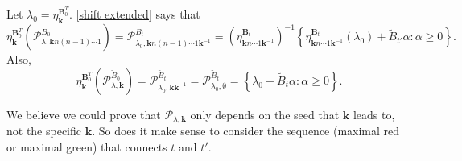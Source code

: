 \documentclass{amsart}
\theoremstyle{definition}
\theoremstyle{remark}
\numberwithin{equation}{section}
\newcommand{\set}[1]{{\left\lbrace #1 \right\rbrace}}
\newcommand{\GG}{{\mathbf G}}
\newcommand{\0}{{\mathbf{0}}}
\newcommand{\kk}{\mathbf{k}}
\newcommand{\tB}{{\tilde{B}}}
\newcommand{\BB}{\mathbf{B}}
\renewcommand{\P}{\mathcal{P}}
\begin{document}


Let $\lambda_0=\eta_\kk^{\BB_0^T}$.
\cref{shift extended} says that  
\[\eta_\kk^{\BB_0^T}(\P_{\lambda,\kk n(n-1)\cdots1}^{\tB_0})=\P_{\lambda_0,\kk n(n-1)\cdots1\kk^{-1}}^{\tB_t}=\left(\eta^{\BB_t}_{\kk n\cdots1\kk^{-1}}\right)^{-1}\set{\eta^{\BB_t}_{\kk n\cdots1\kk^{-1}}(\lambda_0)+\tB_{t'}\alpha:\alpha\ge0}.\]
Also, 
\[\eta_\kk^{\BB_0^T}(\P_{\lambda,\kk}^{\tB_0})=\P_{\lambda_0,\kk\kk^{-1}}^{\tB_t}=\P_{\lambda_0,\emptyset}^{\tB_t}=\set{\lambda_0+\tB_t\alpha:\alpha\ge0}.\]

We believe we could prove that $\P_{\lambda,\kk}$ only depends on the seed that $\kk$ leads to, not the specific $\kk$.
So does it make sense to consider the sequence (maximal red or maximal green) that connects $t$ and $t'$.


\end{document}
